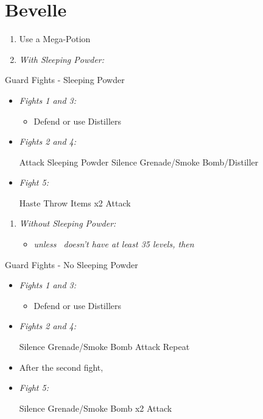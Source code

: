 \chapter{Bevelle}
\begin{enumerate}
	\item Use a Mega-Potion
	\item \textit{With Sleeping Powder:}
\end{enumerate}
\begin{battle}{Guard Fights - Sleeping Powder}
\begin{itemize}
	\item \textit{Fights 1 and 3:}
	\begin{itemize}
		\tidusf Attack
		\item Defend or use Distillers
	\end{itemize}
	\item \textit{Fights 2 and 4:}
	\begin{itemize}
		\tidusf Attack
		\rikkuf Sleeping Powder
		\kimahrif Silence Grenade/Smoke Bomb/Distiller
	\end{itemize}
	\item \textit{Fight 5:}
	\begin{itemize}
		\tidusf Haste \rikku
		\rikkuf Throw Items x2
		\tidusf Attack
	\end{itemize}
\end{itemize}
\end{battle}
\begin{enumerate}[resume]
	\item \textit{Without Sleeping Powder:}
	\begin{itemize}
	\item \formation{\tidus}{\rikku}{\auron} \textit{unless \lulu\ doesn't have at least 35 levels, then } \formation{\tidus}{\rikku}{\lulu}
	\end{itemize}
\end{enumerate}
\begin{battle}{Guard Fights - No Sleeping Powder}
\begin{itemize}
	\item \textit{Fights 1 and 3:}
	\begin{itemize}
		\tidusf Attack
		\item Defend or use Distillers
	\end{itemize}
	\item \textit{Fights 2 and 4:}
	\begin{itemize}
		\switch{\tidus}{\kimahri}
		\kimahrif Silence Grenade/Smoke Bomb
		\switch{\rikku}{\tidus}
		\tidusf Attack
		\kimahrif Repeat
	\end{itemize}
	\item After the second fight, \formation{\tidus}{\rikku}{\lulu}
	\item \textit{Fight 5:}
	\begin{itemize}
		\switch{\tidus}{\rikku}
		\rikkuf Silence Grenade/Smoke Bomb x2
		\switch{\kimahri}{\tidus}
		\tidusf Attack
	\end{itemize}
\end{itemize}
\end{battle}
